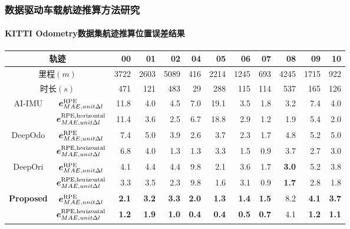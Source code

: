 \begin{frame} 
 	\frametitle{数据驱动车载航迹推算方法研究}
 	\framesubtitle{KITTI Odometry数据集航迹推算位置误差结果}
    {\footnotesize
    \setlength{\tabcolsep}{2pt}
		\begin{tabular*}{\linewidth}{@{\extracolsep{\fill}}ccrrrrrrrrrr}
			\toprule
            \multicolumn{2}{c}{轨迹} & 00 & 01 & 02 & 04 & 05 & 06 & 07 & 08 & 09 & 10 \\
			\midrule
			\multicolumn{2}{c}{里程$\left(\unit{m}\right)$} & 3722 & 2603 & 5089 & 416 & 2214 & 1245 & 693 & 4245 & 1715 & 922 \\
			\multicolumn{2}{c}{时长$\left(\unit{s}\right)$} &  471 &  121 &  483 &  29 &  288 &  115 & 114 &  537 &  165 & 126 \\
			\multirow{2}{*}{AI-IMU}            & $\vb*{e}^{\mathrm{RPE}}_{MAE,unit \Delta l}$ & 11.8 & 4.0 & 4.5 & 7.0 & 19.1 & 3.5 & 1.8 & 3.2 & 7.4 & 4.0 \\
			                                   & $\vb*{e}^{\mathrm{RPE,horizontal}}_{MAE,unit \Delta l}$ & 11.4 & 3.6 & 2.5 & 6.7 & 18.8 & 2.9 & 1.2 & 1.9 & 5.4 & 2.0 \\
			\multirow{2}{*}{DeepOdo}           & $\vb*{e}^{\mathrm{RPE}}_{MAE,unit \Delta l}$ & 7.4 & 5.0 & 3.9 & 2.6 & 3.7 & 2.3 & 1.7 & 4.8 & 5.2 & 5.0 \\
			                                   & $\vb*{e}^{\mathrm{RPE,horizontal}}_{MAE,unit \Delta l}$ & 6.8 & 4.0 & 1.3 & 1.3 & 3.3 & 1.5 & 0.9 & 3.7 & 2.7 & 3.0 \\
			\multirow{2}{*}{DeepOri}           & $\vb*{e}^{\mathrm{RPE}}_{MAE,unit \Delta l}$ & 4.1 & 4.4 & 4.4 & 9.8 & 2.1 & 3.6 & 1.7 & \textbf{3.0} & 5.2 & 3.8 \\
			                                   & $\vb*{e}^{\mathrm{RPE,horizontal}}_{MAE,unit \Delta l}$ & 3.3 & 3.5 & 2.3 & 9.8 & 1.6 & 3.1 & 0.9 & \textbf{1.7} & 2.8 & 1.8 \\
			\multirow{2}{*}{\textbf{Proposed}} & $\vb*{e}^{\mathrm{RPE}}_{MAE,unit \Delta l}$ & \textbf{2.1} & \textbf{3.2} & \textbf{3.3} & \textbf{2.0} & \textbf{1.3} & \textbf{1.4} & \textbf{1.5} & 8.2 & \textbf{4.1} & \textbf{3.7} \\
			                                   & $\vb*{e}^{\mathrm{RPE,horizontal}}_{MAE,unit \Delta l}$ & \textbf{1.2} & \textbf{1.9} & \textbf{1.0} & \textbf{0.4} & \textbf{0.4} & \textbf{0.5} & \textbf{0.7} & 4.1 & \textbf{1.2} & \textbf{1.1} \\
			\bottomrule 
		\end{tabular*}
	}	
\end{frame}

